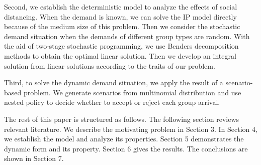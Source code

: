 Second, we establish the deterministic model to analyze the effects of social distancing. When the demand is known, we can solve the IP model directly because of the medium size of this problem. Then we consider the stochastic demand situation when the demands of different group types are random. With the aid of two-stage stochastic programming, we use Benders decomposition methods to obtain the optimal linear solution. Then we develop an integral solution from linear solutions according to the traits of our problem.



Third, to solve the dynamic demand situation, we apply the result of a scenario-based problem. We generate scenarios from multinomial distribution and use nested policy to decide whether to accept or reject each group arrival.




The rest of this paper is structured as follows. The following section reviews relevant literature. We describe the motivating problem in Section 3. In Section 4, we establish the model and analyze its properties. Section 5 demonstrates the dynamic form and its property. Section 6 gives the results. The conclusions are shown in Section 7.

\newpage
